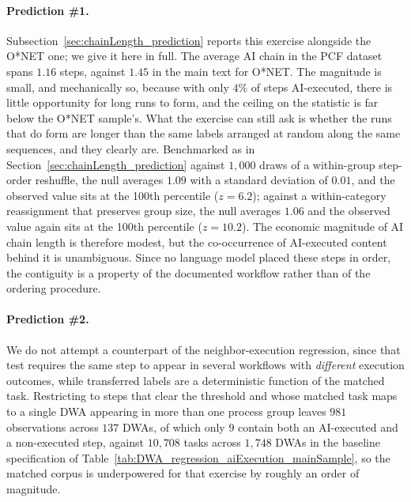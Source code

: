 \paragraph{Prediction \#1.}
Subsection~\ref{sec:chainLength_prediction} reports this exercise alongside the O*NET one; we give it here in full.
The average AI chain in the PCF dataset spans $1.16$ steps, against $1.45$ in the main text for O*NET.
The magnitude is small, and mechanically so, because with only $4\%$ of steps AI-executed, there is little
opportunity for long runs to form, and the ceiling on the statistic is far below the O*NET sample's.
What the exercise can still ask is whether the runs that do form are longer than the same labels arranged at
random along the same sequences, and they clearly are.
Benchmarked as in Section~\ref{sec:chainLength_prediction} against $1{,}000$ draws of a within-group
step-order reshuffle, the null averages $1.09$ with a standard deviation of $0.01$, and the observed value
sits at the 100th percentile ($z = 6.2$); against a within-category reassignment that preserves group size,
the null averages $1.06$ and the observed value again sits at the 100th percentile ($z = 10.2$).
The economic magnitude of AI chain length is therefore modest, but the co-occurrence of AI-executed content behind it is unambiguous.
Since no language model placed these steps in order, the contiguity is a property of the documented workflow
rather than of the ordering procedure.

\paragraph{Prediction \#2.}
We do not attempt a counterpart of the neighbor-execution regression, since that test requires the same step
to appear in several workflows with \emph{different} execution outcomes, while transferred labels are a
deterministic function of the matched task.
Restricting to steps that clear the threshold and whose matched task maps to a single DWA appearing in more
than one process group leaves $981$ observations across $137$ DWAs, of which only $9$ contain both an
AI-executed and a non-executed step, against $10{,}708$ tasks across $1{,}748$ DWAs in the baseline specification of
Table~\ref{tab:DWA_regression_aiExecution_mainSample}, so the matched corpus is underpowered for that exercise
by roughly an order of magnitude.

